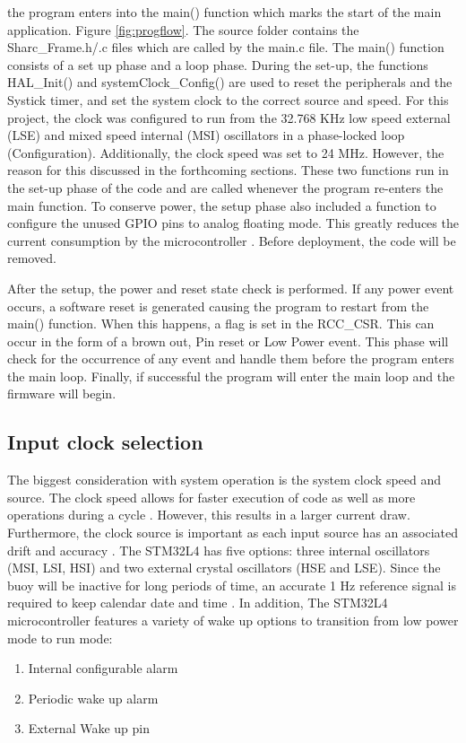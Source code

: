the program enters into the main() function which marks the start of the main application. Figure \ref{fig:progflow}. The source folder contains the Sharc\_Frame.h/.c files which are called by the main.c file. The main() function consists of a set up phase and a loop phase. During the set-up, the functions HAL\_Init() and systemClock\_Config() are used to reset the peripherals and the Systick timer, and set the system clock to the correct source and speed. For this project, the clock was configured to run from the 32.768 KHz low speed external (LSE) and mixed speed internal (MSI) oscillators in a phase-locked loop (Configuration). Additionally, the clock speed was set to 24 MHz. However, the reason for this discussed in the forthcoming sections. These two functions run in the set-up phase of the code and are called whenever the program re-enters the main function. To conserve power, the setup phase also included a function to configure the unused GPIO pins to analog floating mode. This greatly reduces the current consumption by the microcontroller \cite{stm32l4}. Before deployment, the code will be removed. \par


After the setup, the power and reset state check is performed. If any power event occurs, a software reset is generated causing the program to restart from the main() function. When this happens, a flag is set in the RCC\_CSR. This can occur in the form of a brown out, Pin reset or Low Power event. This phase will check for the occurrence of any event and handle them before the program enters the main loop. Finally, if successful the program will enter the main loop and the firmware will begin.  

\subsection{Input clock selection}

The biggest consideration with system operation is the system clock speed and source. The clock speed allows for faster execution of code as well as more operations during a cycle \cite{stm32l4}. However, this results in a larger current draw. Furthermore, the clock source is important as each input source has an associated drift and accuracy \cite{stm32l4ref}. The STM32L4 has five options: three internal oscillators (MSI, LSI, HSI) and two external crystal oscillators (HSE and LSE). Since the buoy will be inactive for long periods of time, an accurate 1 Hz reference signal is required to keep calendar date and time \cite{stm32l4ref}. In addition, The STM32L4 microcontroller features a variety of wake up options to transition from low power mode to run mode:
\begin{enumerate}
	\item Internal  configurable alarm
	\item Periodic wake up alarm
	\item External Wake up pin
\end{enumerate}

